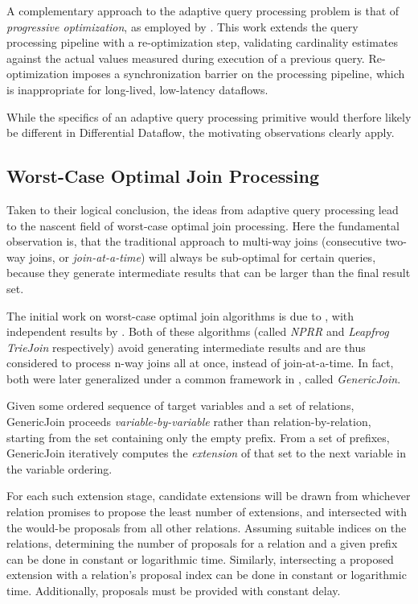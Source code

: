 \documentclass[../index.tex]{subfiles}
\begin{document}
A complementary approach to the adaptive query processing problem is
that of \emph{progressive optimization}, as employed by
\cite{markl2004robust}. This work extends the query processing
pipeline with a re-optimization step, validating cardinality estimates
against the actual values measured during execution of a previous
query. Re-optimization imposes a synchronization barrier on the
processing pipeline, which is inappropriate for long-lived,
low-latency dataflows.

While the specifics of an adaptive query processing primitive would
therfore likely be different in Differential Dataflow, the motivating
observations clearly apply.

\subsection{Worst-Case Optimal Join Processing} \label{technique-wco}

Taken to their logical conclusion, the ideas from adaptive query
processing lead to the nascent field of worst-case optimal join
processing. Here the fundamental observation is, that the traditional
approach to multi-way joins (consecutive two-way joins, or
\emph{join-at-a-time}) will always be sub-optimal for certain queries,
because they generate intermediate results that can be larger than the
final result set.

The initial work on worst-case optimal join algorithms is due to
\cite{ngo2012worst}, with independent results by
\cite{veldhuizen2012leapfrog}. Both of these algorithms (called
\emph{NPRR} and \emph{Leapfrog TrieJoin} respectively) avoid
generating intermediate results and are thus considered to process
n-way joins all at once, instead of join-at-a-time. In fact, both were
later generalized under a common framework in \cite{ngo2013skew},
called \emph{GenericJoin}.

Given some ordered sequence of target variables and a set of
relations, GenericJoin proceeds \emph{variable-by-variable} rather
than relation-by-relation, starting from the set containing only the
empty prefix. From a set of prefixes, GenericJoin iteratively computes
the \emph{extension} of that set to the next variable in the variable
ordering.

For each such extension stage, candidate extensions will be drawn from
whichever relation promises to propose the least number of extensions,
and intersected with the would-be proposals from all other
relations. Assuming suitable indices on the relations, determining the
number of proposals for a relation and a given prefix can be done in
constant or logarithmic time. Similarly, intersecting a proposed
extension with a relation's proposal index can be done in constant or
logarithmic time. Additionally, proposals must be provided with
constant delay.
\end{document}

